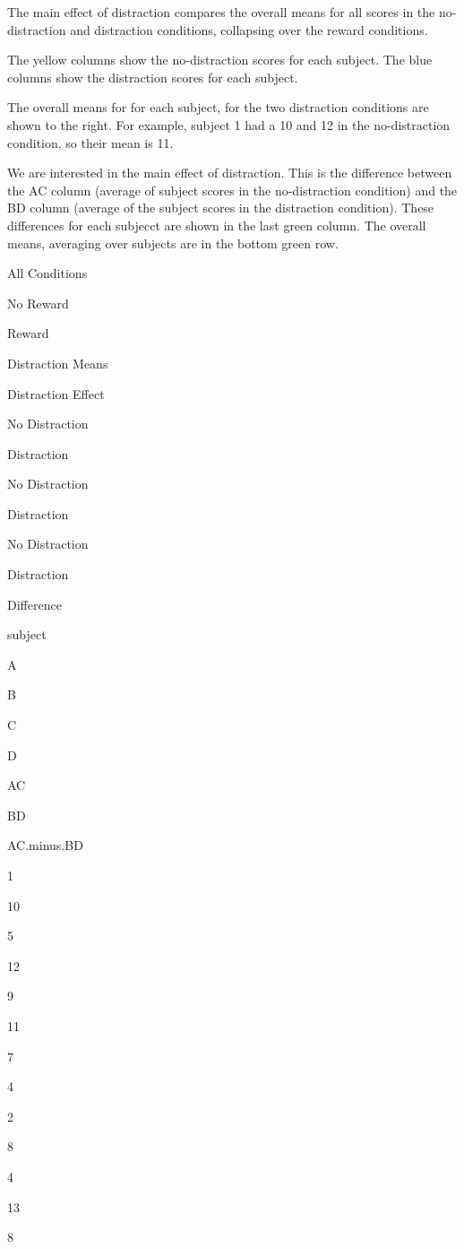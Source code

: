 \documentclass[
]{book}
\begin{document}
The main effect of distraction compares the overall means for all scores in the no-distraction and distraction conditions, collapsing over the reward conditions.

The yellow columns show the no-distraction scores for each subject. The blue columns show the distraction scores for each subject.

The overall means for for each subject, for the two distraction conditions are shown to the right. For example, subject 1 had a 10 and 12 in the no-distraction condition, so their mean is 11.

We are interested in the main effect of distraction. This is the difference between the AC column (average of subject scores in the no-distraction condition) and the BD column (average of the subject scores in the distraction condition). These differences for each subjecct are shown in the last green column. The overall means, averaging over subjects are in the bottom green row.

All Conditions

No Reward

Reward

Distraction Means

Distraction Effect

No Distraction

Distraction

No Distraction

Distraction

No Distraction

Distraction

Difference

subject

A

B

C

D

AC

BD

AC.minus.BD

1

10

5

12

9

11

7

4

2

8

4

13

8
\end{document}
